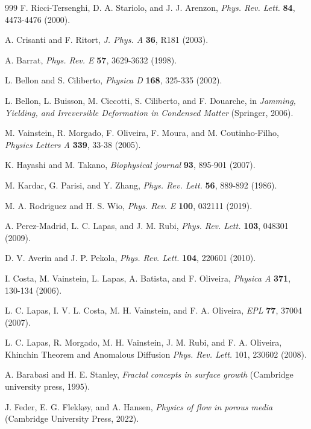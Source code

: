 \documentclass[pre,aps,twocolumn,showpacs,floatfix,nofootinbib,superscriptaddress,linenumbers]{revtex4-1}
\begin{document}
\begin{thebibliography}{999}
 F. Ricci-Tersenghi, D. A. Stariolo, and J. J. Arenzon, \textit{Phys. Rev. Lett.} \textbf{84}, 4473-4476 (2000).

 A. Crisanti and F. Ritort, \textit{J. Phys. A} \textbf{36}, R181 (2003).

 A. Barrat, \textit{Phys. Rev. E} \textbf{57}, 3629-3632 (1998).

 L. Bellon and S. Ciliberto, \textit{Physica D} \textbf{168}, 325-335 (2002).

 L. Bellon, L. Buisson, M. Ciccotti, S. Ciliberto, and F. Douarche, in \textit{Jamming, Yielding, and Irreversible Deformation in Condensed Matter} (Springer, 2006).

 M. Vainstein, R. Morgado, F. Oliveira, F. Moura, and M. Coutinho-Filho, \textit{Physics Letters A} \textbf{339}, 33-38 (2005).

 K. Hayashi and M. Takano, \textit{Biophysical journal} \textbf{93}, 895-901 (2007).

 M. Kardar, G. Parisi, and Y. Zhang, \textit{Phys. Rev. Lett.} \textbf{56}, 889-892 (1986).

 M. A. Rodriguez and H. S. Wio, \textit{Phys. Rev. E} \textbf{100}, 032111 (2019).

 A. Perez-Madrid, L. C. Lapas, and J. M. Rubi, \textit{Phys. Rev. Lett.} \textbf{103}, 048301 (2009).

 D. V. Averin and J. P. Pekola, \textit{Phys. Rev. Lett.} \textbf{104}, 220601 (2010).

 I. Costa, M. Vainstein, L. Lapas, A. Batista, and F. Oliveira, \textit{Physica A} \textbf{371}, 130-134 (2006).

 L. C. Lapas, I. V. L. Costa, M. H. Vainstein, and F. A. Oliveira, \textit{EPL} \textbf{77}, 37004 (2007).

 L. C. Lapas, R. Morgado, M. H. Vainstein, J. M. Rubi, and F. A. Oliveira, Khinchin Theorem and Anomalous Diffusion \textit{Phys. Rev. Lett.} 101, 230602 (2008).

 A. Barabasi and  H. E. Stanley, \textit{Fractal concepts in surface growth} (Cambridge university press, 1995).

 J. Feder, E. G. Flekk{\o}y, and A. Hansen, \textit{Physics of flow in porous media} (Cambridge University Press, 2022).


\end{thebibliography}
\end{document}
